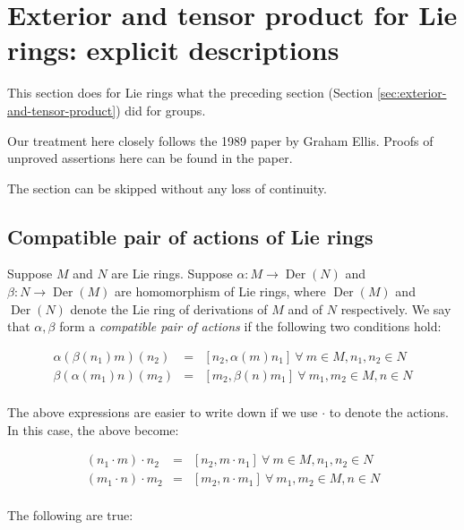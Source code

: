 
\section{Exterior and tensor product for Lie rings: explicit descriptions}\label{sec:exterior-and-tensor-product-lie}

This section does for Lie rings what the preceding section (Section
\ref{sec:exterior-and-tensor-product}) did for groups.

Our treatment here closely follows the 1989 paper \cite{EllisLie} by
Graham Ellis. Proofs of unproved assertions here can be found in the
paper.

The section can be skipped without any loss of continuity.

\subsection{Compatible pair of actions of Lie rings}

Suppose $M$ and $N$ are Lie rings. Suppose $\alpha:M \to
\operatorname{Der}(N)$ and $\beta:N \to \operatorname{Der}(M)$ are
homomorphism of Lie rings, where
$\operatorname{Der}(M)$ and $\operatorname{Der}(N)$ denote the Lie
ring of derivations of $M$ and of $N$ respectively. We say that
$\alpha,\beta$ form a {\em compatible pair of actions} if the
following two conditions hold:

\begin{eqnarray*}
  \alpha(\beta(n_1)m)(n_2) & = & [n_2,\alpha(m)n_1] \ \forall \ m \in M, n_1,n_2 \in N\\
  \beta(\alpha(m_1)n)(m_2) & = & [m_2,\beta(n)m_1] \ \forall \ m_1,m_2 \in M, n \in N\\
\end{eqnarray*}

The above expressions are easier to write down if we use $\cdot$ to denote the actions. In this case, the above become:

\begin{eqnarray*}
  (n_1 \cdot m) \cdot n_2 & = & [n_2,m \cdot n_1] \ \forall \ m \in M, n_1,n_2 \in N\\
  (m_1 \cdot n) \cdot m_2 & = & [m_2, n \cdot m_1] \ \forall \ m_1,m_2 \in M, n \in N \\
\end{eqnarray*}

The following are true:

